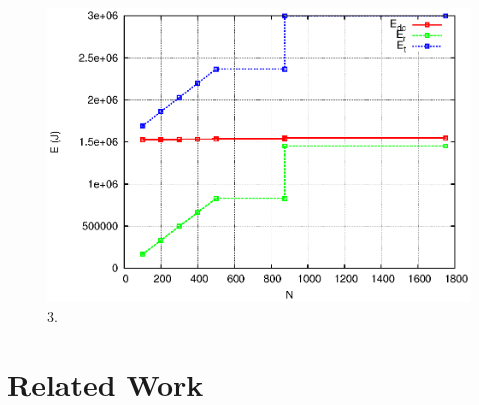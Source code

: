 \documentclass[JIP]{ipsj}
\begin{document}
\begin{figure}[thb]
\begin{center}
\includegraphics[scale=0.5]{graphs/cdnp2p-3.eps}
\end{center}
\caption{3.}
\label{fig:4-3}
\vspace{-2mm}
\end{figure} 






\section{Related Work} 
\end{document}
